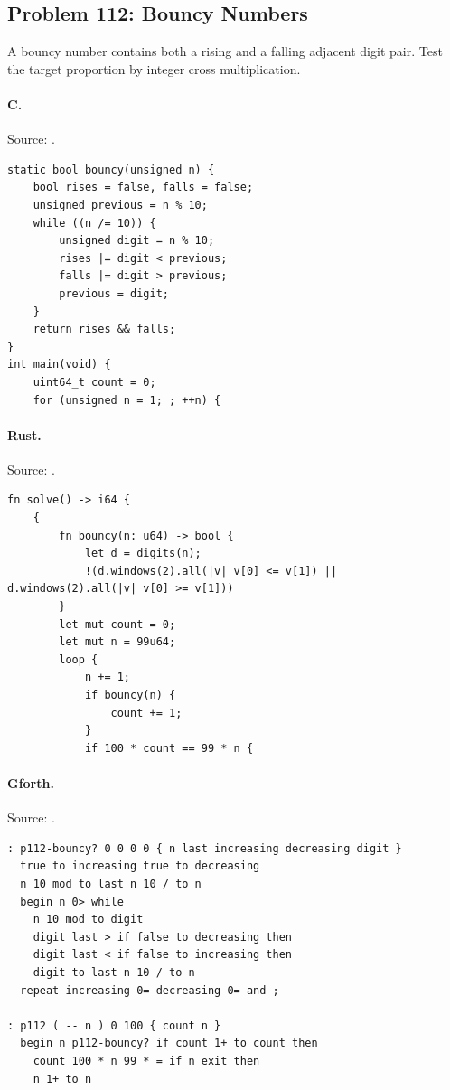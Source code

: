 \subsection{Problem 112: Bouncy Numbers}
\label{walkthrough:p112}
A bouncy number contains both a rising and a falling adjacent digit pair. Test the target proportion by integer cross multiplication.

\paragraph{C.} Source: .
\begin{lstlisting}
static bool bouncy(unsigned n) {
    bool rises = false, falls = false;
    unsigned previous = n % 10;
    while ((n /= 10)) {
        unsigned digit = n % 10;
        rises |= digit < previous;
        falls |= digit > previous;
        previous = digit;
    }
    return rises && falls;
}
int main(void) {
    uint64_t count = 0;
    for (unsigned n = 1; ; ++n) {
\end{lstlisting}

\paragraph{Rust.} Source: .
\begin{lstlisting}
fn solve() -> i64 {
    {
        fn bouncy(n: u64) -> bool {
            let d = digits(n);
            !(d.windows(2).all(|v| v[0] <= v[1]) || d.windows(2).all(|v| v[0] >= v[1]))
        }
        let mut count = 0;
        let mut n = 99u64;
        loop {
            n += 1;
            if bouncy(n) {
                count += 1;
            }
            if 100 * count == 99 * n {
\end{lstlisting}

\paragraph{Gforth.} Source: .
\begin{lstlisting}
: p112-bouncy? 0 0 0 0 { n last increasing decreasing digit }
  true to increasing true to decreasing
  n 10 mod to last n 10 / to n
  begin n 0> while
    n 10 mod to digit
    digit last > if false to decreasing then
    digit last < if false to increasing then
    digit to last n 10 / to n
  repeat increasing 0= decreasing 0= and ;

: p112 ( -- n ) 0 100 { count n }
  begin n p112-bouncy? if count 1+ to count then
    count 100 * n 99 * = if n exit then
    n 1+ to n
\end{lstlisting}

